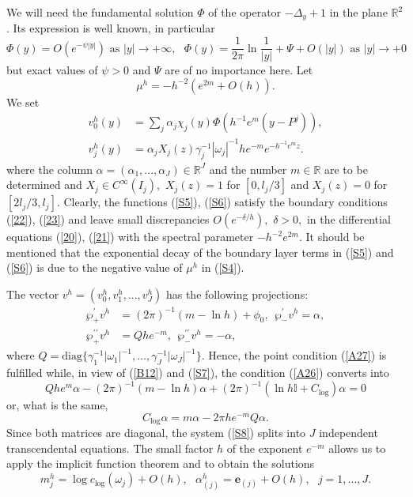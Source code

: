 \documentclass[11pt]{article}%
\numberwithin{equation}{section}
\begin{document}
We will need the fundamental solution $\Phi$ of the operator $-\Delta_{y}+1$
in the plane $\mathbb{R}^{2}$. Its expression is well known, in particular%
\begin{equation}
\Phi(y)=O(e^{-\psi|y|})\text{ as }|y|\rightarrow+\infty,\ \ \ \Phi(y)=\frac
{1}{2\pi}\ln\frac{1}{|y|}+\Psi+O(|y|)\text{ as }|y|\rightarrow+0 \label{S3}%
\end{equation}
but exact values of $\psi>0$ and $\Psi$ are of no importance here. Let%
\begin{equation}
\mu^{h}=-h^{-2}(e^{2m}+O(h)). \label{S4}%
\end{equation}
We set%
\begin{align}
v_{0}^{h}(y)  &  =%
{\textstyle\sum\nolimits_{j}}
\alpha_{j}\chi_{j}(y)\Phi(h^{-1}e^{m}(y-P^{j})),\label{S5}\\
v_{j}^{h}(y)  &  =\alpha_{j}X_{j}(z)\gamma_{j}^{-1}|\omega_{j}|^{-1}%
he^{-m}e^{-h^{-1}e^{m}z}. \label{S6}%
\end{align}
where the column $\alpha=(\alpha_{1},...,\alpha_{J})\in\mathbb{R}^{J}$ and the
number $m\in\mathbb{R}$ are to be determined and $X_{j}\in C^{\infty}(I_{j}),$
$X_{j}(z)=1$ for $[0,l_{j}/3]$ and $X_{j}(z)=0$ for $[2l_{j}/3,l_{j}]$.
Clearly, the functions (\ref{S5}), (\ref{S6}) satisfy the boundary conditions
(\ref{22}), (\ref{23}) and leave small discrepancies $O(e^{-\delta/h}),$
$\delta>0,$ in the differential equations (\ref{20}), (\ref{21}) with the
spectral parameter $-h^{-2}e^{2m}$. It should be mentioned that the
exponential decay of the boundary layer terms in (\ref{S5}) and (\ref{S6}) is
due to the negative value of $\mu^{h}$ in (\ref{S4}).

The vector $v^{h}=(v_{0}^{h},v_{1}^{h},...,v_{J}^{h})$ has the following
projections:%
\begin{align}
\wp_{+}^{\prime}v^{h}  &  =(2\pi)^{-1}(m-\ln h)+\phi_{0},\ \ \wp_{-}^{\prime
}v^{h}=\alpha,\label{S7}\\
\wp_{+}^{\prime\prime}v^{h}  &  =Qhe^{-m},\ \ \wp_{-}^{\prime\prime}%
v^{h}=-\alpha,\nonumber
\end{align}
where $Q=\mathrm{diag}\{\gamma_{1}^{-1}|\omega_{1}|^{-1},...,\gamma_{J}%
^{-1}|\omega_{J}|^{-1}\}.$ Hence, the point condition (\ref{A27}) is fulfilled
while, in view of (\ref{B12}) and (\ref{S7}), the condition (\ref{A26})
converts into%
\[
Qhe^{m}\alpha-(2\pi)^{-1}(m-\ln h)\alpha+(2\pi)^{-1}(\ln h\mathbb{I}+C_{\log
})\alpha=0
\]
or, what is the same,%
\begin{equation}
C_{\log}\alpha=m\alpha-2\pi he^{-m}Q\alpha. \label{S8}%
\end{equation}
Since both matrices are diagonal, the system (\ref{S8}) splits into $J$
independent transcendental equations. The small factor $h$ of the exponent
$e^{-m}$ allows us to apply the implicit function theorem and to obtain the
solutions%
\begin{equation}
m_{j}^{h}=\log c_{\log}(\omega_{j})+O(h),\ \ \ \alpha_{(j)}^{h}=\mathbf{e}%
_{(j)}+O(h),\ \ \ j=1,...,J. \label{S9}%
\end{equation}
\end{document}
